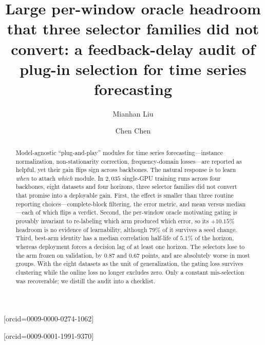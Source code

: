 \documentclass[a4paper,fleqn]{cas-sc}
\makeatletter
\gdef\correspemail{1367489893@qq.com}
\gdef\secondemail{1577027526@qq.com}
\makeatother
\begin{document}
\let\WriteBookmarks\relax
\def\floatpagepagefraction{1}
\def\textpagefraction{.001}


\title[mode = title]{Large per-window oracle headroom that three selector
families did not convert: a feedback-delay audit of plug-in selection for time
series forecasting}

\author[1]{Mianhan Liu}[orcid=0009-0000-0274-1062]
\cormark[1]
\expandafter\ead\expandafter{\correspemail}

\author[1]{Chen Chen}[orcid=0009-0001-1991-9370]
\expandafter\ead\expandafter{\secondemail}



\begin{abstract}
Model-agnostic ``plug-and-play'' modules for time series forecasting---instance
normalization, non-stationarity correction, frequency-domain losses---are reported
as helpful, yet their gain flips sign across backbones. The natural response is to
learn \emph{when} to attach \emph{which} module. In $2{,}035$ single-GPU training
runs across four backbones, eight datasets and four horizons, three selector
families did not convert that promise into a deployable gain. First, the effect is
smaller than three routine reporting choices---complete-block filtering, the error
metric, and mean versus median---each of which flips a verdict. Second, the
per-window oracle motivating gating is provably invariant to re-labeling which arm
produced which error, so its $+10.15\%$ headroom is no evidence of learnability,
although $79\%$ of it survives a seed change. Third, best-arm identity has a median
correlation half-life of $5.1\%$ of the horizon, whereas deployment forces a
decision lag of at least one horizon. The selectors lose to the arm frozen on
validation, by $0.87$ and $0.67$ points, and are absolutely worse in most groups.
With the eight datasets as the unit of generalization, the gating loss survives
clustering while the online loss no longer excludes zero. Only a constant
mis-selection was recoverable; we distill the audit into a checklist.
\end{abstract}
\end{document}

